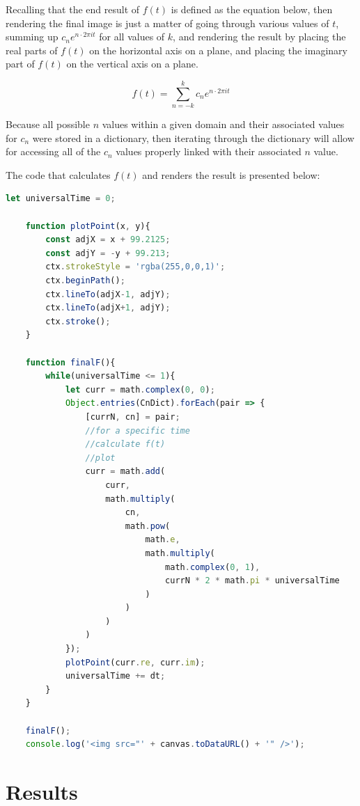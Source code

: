 \documentclass[letterpaper, 12pt]{article}
\begin{document}
Recalling that the end result of \(f(t)\) is defined as the equation
below, then rendering the final image is just a matter of going
through various values of \(t\), summing up \(c_n e^{n \cdot 2\pi it}\)
for all values of \(k\), and rendering the result by placing
the real parts of \(f(t)\) on the horizontal axis on a plane,
and placing the imaginary part of \(f(t)\) on the vertical axis
on a plane.

\begin{equation*}
    f(t) = \sum_{n=-k}^{k} c_n e^{n \cdot 2\pi it}
\end{equation*}

Because all possible \(n\) values within a given domain and
their associated values for \(c_n\) were stored in a dictionary,
then iterating through the dictionary will allow for accessing
all of the \(c_n\) values properly linked with their associated \(n\) value.

The code that calculates \(f(t)\) and renders the result is presented below:
\begin{lstlisting}[language=JavaScript]
    let universalTime = 0;

    function plotPoint(x, y){
        const adjX = x + 99.2125;
        const adjY = -y + 99.213;
        ctx.strokeStyle = 'rgba(255,0,0,1)';
        ctx.beginPath();
        ctx.lineTo(adjX-1, adjY);
        ctx.lineTo(adjX+1, adjY);
        ctx.stroke();
    }

    function finalF(){
        while(universalTime <= 1){
            let curr = math.complex(0, 0);
            Object.entries(CnDict).forEach(pair => {
                [currN, cn] = pair;
                //for a specific time
                //calculate f(t)
                //plot
                curr = math.add(
                    curr,
                    math.multiply(
                        cn,
                        math.pow(
                            math.e,
                            math.multiply(
                                math.complex(0, 1),
                                currN * 2 * math.pi * universalTime
                            )
                        )
                    )
                )
            });
            plotPoint(curr.re, curr.im);
            universalTime += dt;
        }
    }

    finalF();
    console.log('<img src="' + canvas.toDataURL() + '" />');
\end{lstlisting}

\section{Results}
\end{document}
